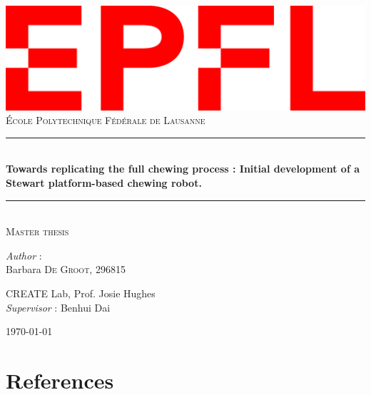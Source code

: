 \documentclass[11pt,a4paper]{article}
\begin{document}
    \begin{titlepage}
    \newcommand{\HRule}{\rule{\linewidth}{0.2mm}}
    \center
    \includegraphics[scale=0.25]{figures/logo.png}\\[0.4cm]

    \textsc{\Large École Polytechnique Fédérale de Lausanne}\\[1.5cm]
    \vfill
    
    \HRule \\[0.4cm]
    {\LARGE \bfseries Towards replicating the full chewing process : Initial development of a Stewart platform-based chewing robot.}\\
    \HRule \\ [0.5cm]
    
    \textsc{\Large Master thesis}
    \vfill 
   
    \centering
    \bigskip
    \textit{Author} : \\[0.2cm]

    Barbara \textsc{De Groot, 296815}\\

    \bigskip
    \bigskip

    CREATE Lab, Prof. Josie Hughes\\
    \textit{Supervisor} : Benhui Dai\\[0.2cm]

    \bigskip
    \bigskip
    
    {\large \today}\\[2cm]
    \end{titlepage}

\newpage
\tableofcontents

\newpage
%

\newpage





\newpage
\section{References}
\printbibliography[heading=none]

% 
% 
\end{document}
